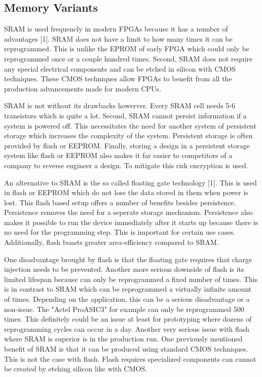 \documentclass{article}
\begin{document}
    \subsection{Memory Variants}

    SRAM is used frequencly in modern FPGAs because it has a number of advantages [1]. SRAM
    does not have a limit to how many times it can be reprogrammed. This is unlike the
    EPROM of early FPGA which could only be reprogrammed once or a couple hundred times.
    Second, SRAM does not require any special electrical components and can be etched
    in silicon with CMOS techniques. These CMOS techniques allow FPGAs to benefit from
    all the production advancements made for modern CPUs.

    SRAM is not without its drawbacks howerver. Every SRAM cell needs 5-6 transistors
    which is quite a lot. Second, SRAM cannot persist information if a system is powered
    off. This necessitates the need for another system of persistent storage which increases
    the complexity of the system. Persistent storage is often provided by flash or EEPROM.
    Finally, storing a design in a persistent storage system like flash or EEPROM also
    makes it far easier to competitors of a company to reverse engineer a design.
    To mitigate this risk encryption is used.

    An alternative to SRAM is the so called floating gate technology [1]. This is used
    in flash or EEPROM which do not lose the data stored in them when power is lost.
    This flash based setup offers a number of benefits besides persistence.
    Persistence removes the need for a seperate storage mechanism. Persistence also
    makes it possible to run the device immediately after it starts up because there
    is no need for the programming step. This is important for certain use cases.
    Additionally, flash boasts greater area-efficiency compared to SRAM.

    One disadvantage brought by flash is that the floating gate requires that
    charge injection needs to be prevented. Another more serious downside of flash
    is its limited lifespan because can only be reprogrammed a fixed number of times.
    This is in contrast to SRAM which can be reprogrammed a virtually infinite amount of times.
    Depending on the application, this can be a serious disadvantage or a non-issue.
    The "Actel ProASIC3" for example can only be reprogrammed 500 times.
    This definitely could be an issue at least for prototyping where dozens of reprogramming
    cycles can occur in a day. Another very serious issue with flash where SRAM
    is superior is in the production run. One previously mentioned benefit of SRAM
    is that it can be produced using standard CMOS techniques. This is not the case with
    flash. Flash requires specialized components can cannot be created by etching
    silicon like with CMOS.
\end{document}

